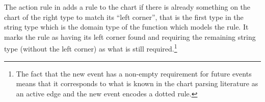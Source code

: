 


The action rule in \preveg{} adds a rule to the chart if there is
already something on the chart of the right type to match its ``left
corner'', that is the first type in the string type which is the
domain type of the function which models the rule.  It marks the rule
as having its left corner found and requiring the remaining string
type (without the left corner) as what is still required.\footnote{The fact that
the new event has a non-empty requirement for future events means that
it corresponds to what is known in the chart parsing literature as an
active edge and the new event encodes a dotted rule.}

